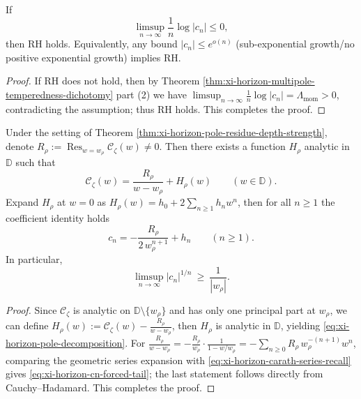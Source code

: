 \begin{corollary}\label{cor:xi-horizon-subexp-growth-implies-rh}
If
\[
\limsup_{n\to\infty}\frac{1}{n}\log|c_n|\le 0,
\]
then RH holds.
Equivalently, any bound \( |c_n|\le e^{o(n)} \) (sub-exponential growth/no positive exponential growth) implies RH.
\end{corollary}

\begin{proof}
If RH does not hold, then by Theorem \ref{thm:xi-horizon-multipole-temperedness-dichotomy} part (2) we have
\(
\limsup_{n\to\infty}\frac{1}{n}\log|c_n|
=\Lambda_{\mathrm{mom}}>0
\),
contradicting the assumption; thus RH holds. This completes the proof.
\end{proof}

\begin{theorem}\label{thm:xi-horizon-forced-geometric-tail}
Under the setting of Theorem \ref{thm:xi-horizon-pole-residue-depth-strength}, denote
\(
R_{\rho}:=\operatorname*{Res}_{w=w_{\rho}}\mathscr{C}_{\zeta}(w)
\neq 0
\).
Then there exists a function \(H_{\rho}\) analytic in \(\mathbb{D}\) such that
\begin{equation}\label{eq:xi-horizon-pole-decomposition}
\boxed{\;
\mathscr{C}_{\zeta}(w)=\frac{R_{\rho}}{w-w_{\rho}}+H_{\rho}(w)\qquad(w\in\mathbb{D}).\;}
\end{equation}
Expand \(H_{\rho}\) at \(w=0\) as \(H_{\rho}(w)=h_0+2\sum_{n\ge 1}h_n w^n\), then for all \(n\ge 1\) the coefficient identity holds
\begin{equation}\label{eq:xi-horizon-cn-forced-tail}
\boxed{\;
c_n=-\frac{R_{\rho}}{2\,w_{\rho}^{n+1}}+h_n\qquad(n\ge 1).\;}
\end{equation}
In particular,
\[
\limsup_{n\to\infty}|c_n|^{1/n}\ \ge\ \frac{1}{|w_{\rho}|}.
\]
\end{theorem}

\begin{proof}
Since \(\mathscr{C}_{\zeta}\) is analytic on \(\mathbb{D}\setminus\{w_{\rho}\}\) and has only one principal part at \(w_{\rho}\), we can define
\(
H_{\rho}(w):=\mathscr{C}_{\zeta}(w)-\frac{R_{\rho}}{w-w_{\rho}}
\),
then \(H_{\rho}\) is analytic in \(\mathbb{D}\), yielding \eqref{eq:xi-horizon-pole-decomposition}.
For \(\frac{R_{\rho}}{w-w_{\rho}}=-\frac{R_{\rho}}{w_{\rho}}\cdot\frac{1}{1-w/w_{\rho}}
=-\sum_{n\ge 0}R_{\rho}\,w_{\rho}^{-(n+1)}w^n\), comparing the geometric series expansion with \eqref{eq:xi-horizon-carath-series-recall} gives \eqref{eq:xi-horizon-cn-forced-tail}; the last statement follows directly from Cauchy--Hadamard. This completes the proof.
\end{proof}

